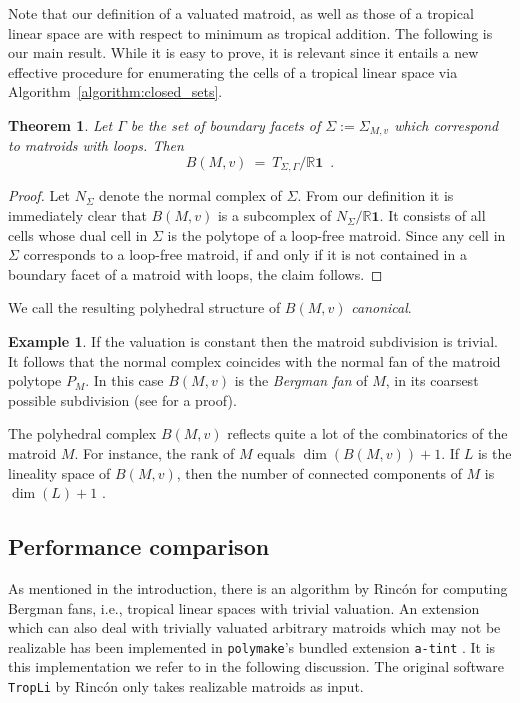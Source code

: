 \documentclass[11pt,a4paper]{amsart}
\theoremstyle{definition}
\newtheorem{example}[definition]{Example}
\theoremstyle{plain}
\newtheorem{theorem}[definition]{Theorem}
\begin{document}
Note that our definition of a valuated matroid, as well as those of a tropical linear space are with respect to minimum as tropical addition. 
The following is our main result.
While it is easy to prove, it is relevant since it entails a new effective procedure for enumerating the cells of a tropical linear space via Algorithm~\ref{algorithm:closed_sets}.
\begin{theorem}
  Let $\Gamma$ be the set of boundary facets of $\Sigma := \Sigma_{M,v}$ which correspond to matroids with loops.
  Then
  \begin{equation}
   B(M,v) \ = \ T_{\Sigma,\Gamma}/{\mathbb{R}}{{\mathbf 1}}\enspace.
  \end{equation}

\end{theorem}
\begin{proof}
 Let $N_\Sigma$ denote the normal complex of $\Sigma$. From our definition it is immediately clear that $B(M,v)$ is a subcomplex of $N_\Sigma / {\mathbb{R}}{{\mathbf 1}}$. 
 It consists of all cells whose dual cell in $\Sigma$ is the polytope of a loop-free matroid. Since any cell in $\Sigma$ corresponds to a loop-free matroid, if and only if it is not contained in a boundary facet of a matroid with loops, the claim follows.
\end{proof}
We call the resulting polyhedral structure of $B(M,v)$ \emph{canonical}.
\begin{example}
  If the valuation is constant then the matroid subdivision is trivial.
  It follows that the normal complex coincides with the normal fan of the matroid polytope $P_M$.
   In this case $B(M,v)$ is the \emph{Bergman fan} of $M$, in its coarsest possible subdivision (see \cite{HampeThesis2014} for a proof).
\end{example}
The polyhedral complex $B(M,v)$ reflects quite a lot of the combinatorics of the matroid $M$.
For instance, the rank of $M$ equals $\dim(B(M,v)) + 1$.
If $L$ is the lineality space of $B(M,v)$, then the number of connected components of $M$ is $\dim(L) +1$ \cite{FeichtnerSturmfels:2005}.

\subsection{Performance comparison}\label{subsec:performance}
As mentioned in the introduction, there is an algorithm by Rinc\'{o}n \cite{Rincon:2013} for computing Bergman fans, i.e., tropical linear spaces with trivial valuation.
An extension which can also deal with trivially valuated arbitrary matroids which may not be realizable has been implemented in {\texttt{poly\-make}\xspace}'s bundled extension \texttt{a-tint} \cite{hatint}.
It is this implementation we refer to in the following discussion.
The original software \texttt{TropLi} by Rinc\'on only takes realizable matroids as input.
\end{document}
